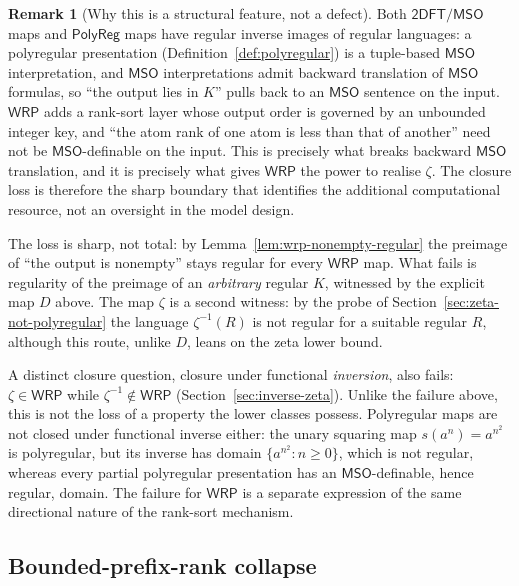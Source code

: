 \documentclass[11pt]{article}
\theoremstyle{definition}
\newtheorem{remark}[theorem]{Remark}
\newcommand{\WRP}{\mathsf{WRP}}
\newcommand{\TDFT}{\mathsf{2DFT}}
\newcommand{\MSO}{\mathsf{MSO}}
\newcommand{\polyreg}{\mathsf{PolyReg}}
\begin{document}
\begin{remark}[Why this is a structural feature, not a defect]
\label{rem:closure-boundary}
Both $\TDFT/\MSO$ maps and $\polyreg$ maps have regular inverse
images of regular languages: a polyregular presentation
(Definition~\ref{def:polyregular}) is a tuple-based $\MSO$
interpretation, and $\MSO$ interpretations admit backward translation
of $\MSO$ formulas, so ``the output lies in $K$'' pulls back to an
$\MSO$ sentence on the input.  $\WRP$ adds a rank-sort layer whose
output order is governed by an unbounded integer key, and ``the atom rank of
one atom is less than that of another'' need not be $\MSO$-definable
on the input.  This is precisely what breaks backward $\MSO$
translation, and it is precisely what gives $\WRP$ the power to
realise $\zeta$.  The closure loss is therefore the sharp boundary that
identifies the additional computational resource, not an oversight in
the model design.

The loss is sharp, not total: by Lemma~\ref{lem:wrp-nonempty-regular} the
preimage of ``the output is nonempty'' stays regular for every $\WRP$
map.  What fails is regularity of the preimage of an \emph{arbitrary}
regular $K$, witnessed by the explicit map $D$ above.  The map $\zeta$
is a second witness: by the probe of Section~\ref{sec:zeta-not-polyregular} the
language $\zeta^{-1}(R)$ is not regular for a suitable regular $R$, although
this route, unlike $D$, leans on the zeta lower bound.

A distinct closure question, closure under functional \emph{inversion}, also
fails: $\zeta\in\WRP$ while $\zeta^{-1}\notin\WRP$
(Section~\ref{sec:inverse-zeta}).  Unlike the failure above, this is not the
loss of a property the lower classes possess.  Polyregular maps are not closed
under functional inverse either: the unary squaring map
$s(a^n)=a^{n^2}$ is polyregular, but its inverse has domain
$\{a^{n^2}:n\ge0\}$, which is not regular, whereas every partial polyregular
presentation has an $\MSO$-definable, hence regular, domain.  The failure for
$\WRP$ is a separate expression of the same directional nature of the
rank-sort mechanism.
\end{remark}

\subsection{Bounded-prefix-rank collapse}
\end{document}
